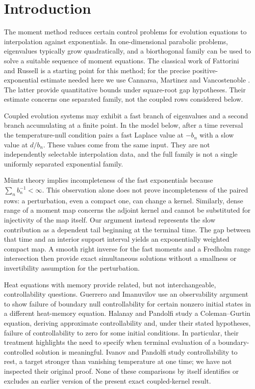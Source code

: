 \section{Introduction}\label{sec:intro}
The moment method reduces certain control problems for evolution equations to interpolation against exponentials. In one-dimensional parabolic problems, eigenvalues typically grow quadratically, and a biorthogonal family can be used to solve a suitable sequence of moment equations. The classical work of Fattorini and Russell \cite{FattoriniRussell1971} is a starting point for this method; for the precise positive-exponential estimate needed here we use Cannarsa, Martinez and Vancostenoble \cite{Cannarsa2020}. The latter provide quantitative bounds under square-root gap hypotheses. Their estimate concerns one separated family, not the coupled rows considered below.

Coupled evolution systems may exhibit a fast branch of eigenvalues and a second branch accumulating at a finite point. In the model below, after a time reversal the temperature-null condition pairs a fast Laplace value at \(-b_n\) with a slow value at \(d/b_n\). These values come from the same input. They are not independently selectable interpolation data, and the full family is not a single uniformly separated exponential family.

M\"untz theory \cite{Almira2007} implies incompleteness of the fast exponentials because \(\sum_n b_n^{-1}<\infty\). This observation alone does not prove incompleteness of the paired rows: a perturbation, even a compact one, can change a kernel. Similarly, dense range of a moment map concerns the adjoint kernel and cannot be substituted for injectivity of the map itself. Our argument instead represents the slow contribution as a dependent tail beginning at the terminal time. The gap between that time and an interior support interval yields an exponentially weighted compact map. A smooth right inverse for the fast moments and a Fredholm range intersection then provide exact simultaneous solutions without a smallness or invertibility assumption for the perturbation.

Heat equations with memory provide related, but not interchangeable, controllability questions. Guerrero and Imanuvilov \cite{Guerrero2013} use an observability argument to show failure of boundary null controllability for certain nonzero initial states in a different heat-memory equation. Halanay and Pandolfi \cite{HalanayPandolfi2015} study a Coleman--Gurtin equation, deriving approximate controllability and, under their stated hypotheses, failure of controllability to zero for some initial conditions. In particular, their treatment highlights the need to specify when terminal evaluation of a boundary-controlled solution is meaningful. Ivanov and Pandolfi \cite{IvanovPandolfi2009} study controllability to rest, a target stronger than vanishing temperature at one time; we have not inspected their original proof. None of these comparisons by itself identifies or excludes an earlier version of the present exact coupled-kernel result.

